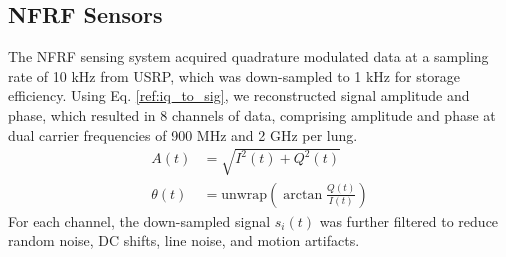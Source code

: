 \documentclass[journal]{IEEEtran}
\begin{document}
\subsection{NFRF Sensors}
The NFRF sensing system acquired quadrature modulated data at a sampling rate of 10 kHz from USRP, which was down-sampled to 1 kHz for storage efficiency. Using Eq. \ref{ref:iq_to_sig}, we reconstructed signal amplitude and phase, which resulted in 8 channels of data, comprising amplitude and phase at dual carrier frequencies of 900 MHz and 2 GHz per lung. 
\begin{equation}
    \begin{split}
        A(t) &= \sqrt{I^2(t) + Q^2(t)} \\
        \theta (t) &= \text{unwrap}(\arctan \frac{Q(t)}{I(t)})
    \end{split}
    \label{ref:iq_to_sig}    
\end{equation}
For each channel, the down-sampled signal $s_{i}(t)$ was further filtered to reduce random noise, DC shifts, line noise, and motion artifacts. 
\end{document}
